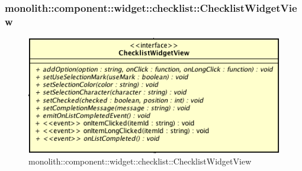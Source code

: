 \subsubsection{monolith::component::widget::checklist::ChecklistWidgetView}

\label{monolith::component::widget::checklist::ChecklistWidgetView}
\begin{figure}[H]
	\centering
	\includegraphics[scale=0.5]{Sezioni/SottosezioniST/img/ChecklistWidgetView.png}
	\caption{monolith::component::widget::checklist::ChecklistWidgetView}
\end{figure}

